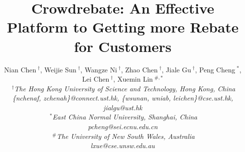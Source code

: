 \documentclass[conference]{IEEEtran}
\title{Crowdrebate: An Effective Platform to Getting more Rebate for Customers}
\author{
	{Nian Chen{\small $~^{\dagger}$}, Weijie Sun{\small $~^{\dagger}$}, Wangze Ni{\small $~^{\dagger}$}, Zhao Chen{\small $~^{\dagger}$}, Jiale Gu{\small $~^{\dagger}$}, Peng Cheng{\small $~^{*}$}, Lei Chen{\small $~^{\dagger}$}, Xuemin Lin{\small $~^{\#,*}$}
	} \\
	\fontsize{10}{10}\selectfont\itshape
	$~^{\dagger}$The Hong Kong University of Science and Technology, Hong Kong, China\\
	\fontsize{9}{9}\selectfont\ttfamily\upshape
	\{nchenaf, zchenah\}@connect.ust.hk, \{wsunan, wniab, leichen\}@cse.ust.hk, jialgu@ust.hk\\
	\fontsize{10}{10}\selectfont\itshape
	$~^{*}$East China Normal University, Shanghai, China\\
	\fontsize{9}{9}\selectfont\ttfamily\upshape pcheng@sei.ecnu.edu.cn \\
	\fontsize{10}{10}\selectfont\itshape
	$~^{\#}$The University of New South Wales, Australia\\
	\fontsize{9}{9}\selectfont\ttfamily\upshape
	lxue@cse.unsw.edu.au\\
}
\begin{document}
\maketitle





%



\balance




\bgroup\small

\let\xxx=\bibitem\def\bibitem{\par\vspace{0mm}\xxx} %

\egroup

\nobalance
\newpage
\end{document}
